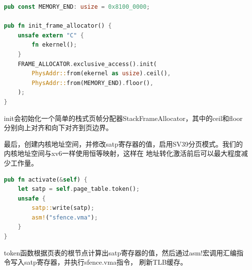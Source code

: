 \begin{lstlisting}[language=Rust,caption={物理页帧分配器初始化}, label={lst:frame-allocator-init}]
pub const MEMORY_END: usize = 0x8100_0000;

pub fn init_frame_allocator() {
    unsafe extern "C" {
        fn ekernel();
    }
    FRAME_ALLOCATOR.exclusive_access().init(
        PhysAddr::from(ekernel as usize).ceil(),
        PhysAddr::from(MEMORY_END).floor(),
    );
}
\end{lstlisting}

init会初始化一个简单的栈式页帧分配器StackFrameAllocator，其中的ceil和floor分别向上对齐和向下对齐到页边界。

最后，创建内核地址空间，并修改satp寄存器的值，启用SV39分页模式。我们的内核地址空间与xv6一样使用恒等映射，这样在
地址转化激活前后可以最大程度减少工作量。

\begin{lstlisting}[language=Rust,caption={内核地址空间激活}, label={lst:kernel-space-activate}]
pub fn activate(&self) {
    let satp = self.page_table.token();
    unsafe {
        satp::write(satp);
        asm!("sfence.vma");
    }
}
\end{lstlisting}

token函数根据页表的根节点计算出satp寄存器的值，然后通过asm!宏调用汇编指令写入satp寄存器，并执行sfence.vma指令，
刷新TLB缓存。

